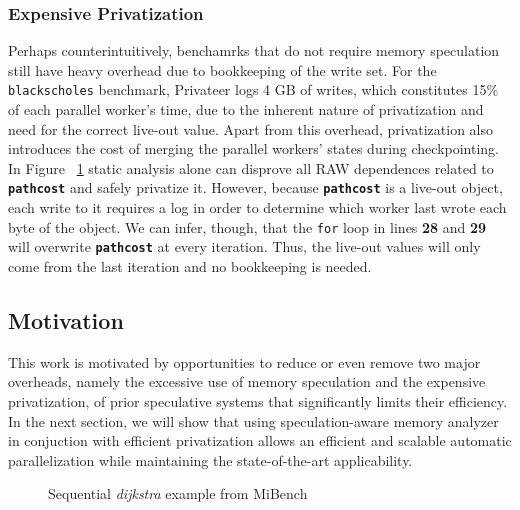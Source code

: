\subsubsection{Expensive Privatization}
Perhaps counterintuitively, benchamrks that do not require memory
speculation still have heavy overhead due to bookkeeping of the write set.
For the \texttt{blackscholes} benchmark, Privateer logs 4 GB of writes,
which constitutes 15\% of each parallel worker's time, due to the inherent
nature of privatization and need for the correct live-out value. Apart from
this overhead, privatization also introduces the cost of merging the
parallel workers' states during checkpointing. In Figure
~\ref{fig:dijkstra_motivation} static analysis alone can disprove all RAW
dependences related to \texttt{\textbf{pathcost}} and safely privatize it.
However, because \texttt{\textbf{pathcost}} is a live-out object, each
write to it requires a log in order to determine which worker last wrote
each byte of the object. We can infer, though, that the \texttt{for} loop
in lines \textbf{28} and \textbf{29} will overwrite
\texttt{\textbf{pathcost}} at every iteration. Thus, the live-out values
will only come from the last iteration and no bookkeeping is needed.

\subsection{Motivation}
This work is motivated by opportunities to reduce or even remove two
major overheads, namely the excessive use of memory speculation and the
expensive privatization, of prior speculative systems that significantly
limits their efficiency.
%
In the next section, we will show that using speculation-aware memory
analyzer in conjuction with efficient privatization allows an efficient and
scalable automatic parallelization while maintaining the state-of-the-art
applicability.


\lstset{basicstyle=\ttfamily, numbers=left, numberstyle=\tiny,
  stepnumber=1, numbersep=5pt}
\begin{figure}[t]
  \centering
  \scriptsize
    \subfloat{
    \begin{minipage}{5cm}
      
    \end{minipage}
    }
\caption{Sequential \textit{dijkstra} example from MiBench~\cite{guthaus:2001:iiwsc}}
\label{fig:dijkstra_motivation}
\end{figure}
